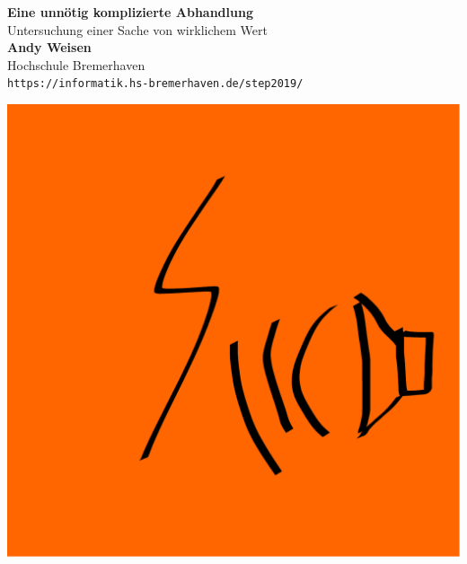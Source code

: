 \documentclass[paper=a1,pagesize,parskip=half-,fontsize=24.88pt]{scrartcl}
\begin{document}
\begin{minipage}[b]{0.74\linewidth}
  \huge\textbf{Eine unnötig komplizierte Abhandlung}\\[1cm]
  \huge{Untersuchung einer Sache von wirklichem Wert}\\[2cm] 
  \huge\textbf{Andy Weisen}\\[0.5cm]
  \Large Hochschule Bremerhaven\\[0.4cm]
  \Large\texttt{https://informatik.hs-bremerhaven.de/step2019/}\\
\end{minipage}
%
\begin{minipage}[t]{0.25\linewidth}
\includegraphics[width=14cm]{Thunderlogo}\\
\end{minipage}
\end{document}

